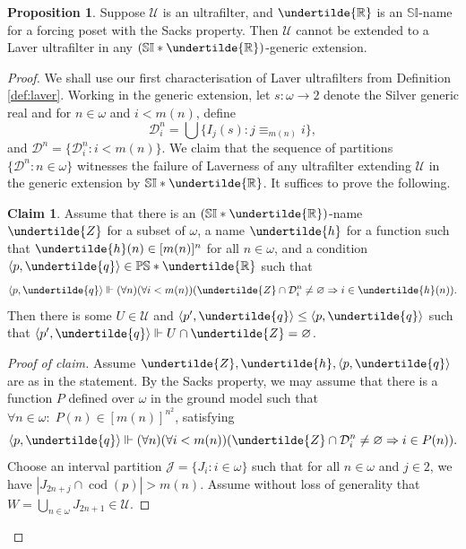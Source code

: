 \documentclass[12pt]{article}
\theoremstyle{definition}
\newtheorem{prp}[nummer]{\sc Proposition}
\newtheorem{claim}[nummer]{\sc Claim}
\begin{document}
\begin{prp}\label{prp:silver}
Suppose $\mathcal{U}$ is an ultrafilter, and $\undertilde{\mathbb{R}}$ is an $\mathbb{SI}$-name for a forcing poset with the Sacks property. Then $\mathcal{U}$ cannot be extended to a Laver ultrafilter in any $(\mathbb{SI}*\undertilde{\mathbb{R}})$-generic extension.
\end{prp}
\begin{proof}

We shall use our first characterisation of Laver ultrafilters from Definition \ref{def:laver}. Working in the generic extension, let $s:\omega \to 2$ denote the Silver generic real and for $n\in\omega$ and $i<m(n)$, define
$$\mathcal{D}^n_i=\bigcup\{I_j(s) : j\equiv_{m(n)}i\},$$
and $\mathcal{D}^n=\{\mathcal{D}^n_i : i<m(n)\}$. We claim that the sequence of partitions $\{\mathcal{D}^{n} : n\in\omega\}$ witnesses the failure of Laverness of any ultrafilter extending $\mathcal{U}$ in the generic extension by $\mathbb{SI}*\undertilde{\mathbb{R}}$. It suffices to prove the following.
\begin{claim}
Assume that there is an $(\mathbb{SI}*\undertilde{\mathbb{R}})$-name $\undertilde{Z}$ for a subset of $\omega$, a name $\undertilde{h}$ for a function such that $\undertilde{h}(n)\in[m(n)]^n$ for all $n\in\omega$, and a condition $\langle p,\undertilde{q}\rangle\in \mathbb{PS}*\undertilde{\mathbb{R}}$ such that $$\langle p,\undertilde{q}\rangle \Vdash (\forall n)(\forall i< m(n)) (\undertilde{Z}\cap \mathcal{D}^n_i\neq \varnothing \Rightarrow i\in \undertilde{h}(n)).$$
Then there is some $U\in\mathcal{U}$ and $\langle p', \undertilde{q}\rangle\leq \langle p, \undertilde{q}\rangle$ such that $\langle p', \undertilde{q}\rangle \Vdash U\cap \undertilde{Z}=\varnothing$.
\end{claim}
\begin{proof}[Proof of claim]
Assume $\undertilde{Z}, \undertilde{h}, \langle p,\undertilde{q}\rangle$ are as in the statement. By the Sacks property, we may assume that there is a function $P$ defined over $\omega$ in the ground model such that $\forall n \in \omega: \; P(n)\in [m(n)]^{n^2}$, satisfying
$$\langle p,\undertilde{q}\rangle \Vdash (\forall n)(\forall i< m(n)) (\undertilde{Z}\cap \mathcal{D}^n_i\neq \varnothing \Rightarrow i\in P(n)).$$
Choose an interval partition $\mathcal{J}=\{J_i : i\in\omega\}$ such that for all $n\in\omega$ and $j\in 2$, we have $|J_{2n+j}\cap \operatorname{cod}(p)|> m(n)$. Assume without loss of generality that $W=\bigcup_{n\in\omega}J_{2n+1}\in\mathcal{U}$.


\end{proof}
\end{proof}
\end{document}

